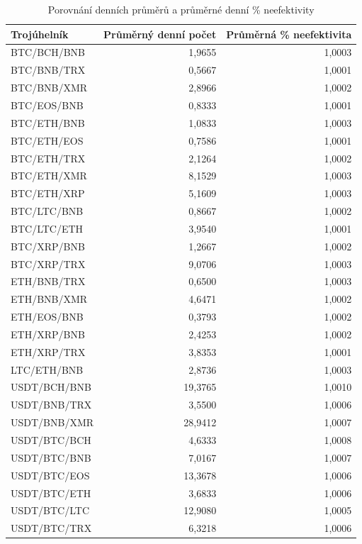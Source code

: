 \documentclass[thesis=B,czech]{FITthesis}[2019/03/21]
\begin{document}
\begin{table}\centering
\caption{Porovnání denních průměrů a průměrné denní \% neefektivity}
\label{table_averages}
\begin{tabular}{|| l | r | r ||}\hline Trojúhelník & Průměrný denní počet & Průměrná \% neefektivita\\
 \hline\hline BTC/BCH/BNB & 1,9655 & 1,0003\\ 
 \hline BTC/BNB/TRX & 0,5667 & 1,0001\\ 
 \hline BTC/BNB/XMR & 2,8966 & 1,0002\\ 
 \hline BTC/EOS/BNB & 0,8333 & 1,0001\\ 
 \hline BTC/ETH/BNB & 1,0833 & 1,0003\\ 
 \hline BTC/ETH/EOS & 0,7586 & 1,0001\\ 
 \hline BTC/ETH/TRX & 2,1264 & 1,0002\\ 
 \hline BTC/ETH/XMR & 8,1529 & 1,0003\\ 
 \hline BTC/ETH/XRP & 5,1609 & 1,0003\\ 
 \hline BTC/LTC/BNB & 0,8667 & 1,0002\\ 
 \hline BTC/LTC/ETH & 3,9540 & 1,0001\\ 
 \hline BTC/XRP/BNB & 1,2667 & 1,0002\\ 
 \hline BTC/XRP/TRX & 9,0706 & 1,0003\\ 
 \hline ETH/BNB/TRX & 0,6500 & 1,0003\\ 
 \hline ETH/BNB/XMR & 4,6471 & 1,0002\\ 
 \hline ETH/EOS/BNB & 0,3793 & 1,0002\\ 
 \hline ETH/XRP/BNB & 2,4253 & 1,0002\\ 
 \hline ETH/XRP/TRX & 3,8353 & 1,0001\\ 
 \hline LTC/ETH/BNB & 2,8736 & 1,0003\\ 
 \hline USDT/BCH/BNB & 19,3765 & 1,0010\\ 
 \hline USDT/BNB/TRX & 3,5500 & 1,0006\\ 
 \hline USDT/BNB/XMR & 28,9412 & 1,0007\\ 
 \hline USDT/BTC/BCH & 4,6333 & 1,0008\\ 
 \hline USDT/BTC/BNB & 7,0167 & 1,0007\\ 
 \hline USDT/BTC/EOS & 13,3678 & 1,0006\\ 
 \hline USDT/BTC/ETH & 3,6833 & 1,0006\\ 
 \hline USDT/BTC/LTC & 12,9080 & 1,0005\\ 
 \hline USDT/BTC/TRX & 6,3218 & 1,0006\\ 

\end{tabular}
\end{table}
\end{document}
